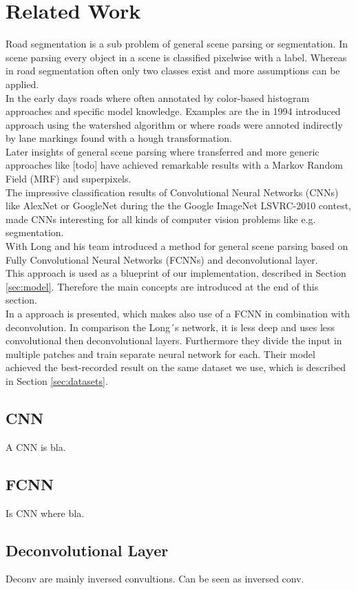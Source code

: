 
\section{Related Work}\label{sec:related-work}
Road segmentation is a sub problem of general scene parsing or segmentation. In scene parsing every object in a scene is classified pixelwise with a label. Whereas in road segmentation often only two classes exist and more assumptions can be applied.\\
In the early days roads where often annotated by color-based histogram approaches and specific model knowledge. Examples are the in 1994 introduced approach \cite{Beucher1990} using the watershed algorithm or \cite{aly2008real} where roads were annoted indirectly by lane markings found with a hough transformation.\\
Later insights of general scene parsing where transferred and more generic approaches like [todo] have achieved remarkable results with a Markov Random Field (MRF) and superpixels.\\
The impressive classification results of Convolutional Neural Networks (CNNs) like AlexNet \cite{krizhevsky2012imagenet} or GoogleNet \cite{SzegedyLJSRAEVR14} during the the Google ImageNet LSVRC-2010 contest, made CNNs interesting for all kinds of computer vision problems like e.g. segmentation. \\
With \cite{long2014fully} Long and his team introduced a method for general scene parsing based on Fully Convolutional Neural Networks (FCNNs) and deconvolutional layer.\\
This approach is used as a blueprint of our implementation, described in Section \ref{sec:model}. Therefore the main concepts are introduced at the end of this section.\\
In \cite{mohan2014deep} a approach is presented, which makes also use of a FCNN in combination with deconvolution. In comparison the Long´s network, it is less deep and uses less convolutional then deconvolutional layers. Furthermore they divide the input in multiple patches and train separate neural network for each. Their model achieved the best-recorded result on the same dataset we use, which is described in Section \ref{sec:datasets}.    

\subsection{CNN}
A CNN is bla.

\subsection{FCNN}
Is CNN where bla.

\subsection{Deconvolutional Layer}
Deconv are mainly inversed convultions. Can be seen as inversed conv.
